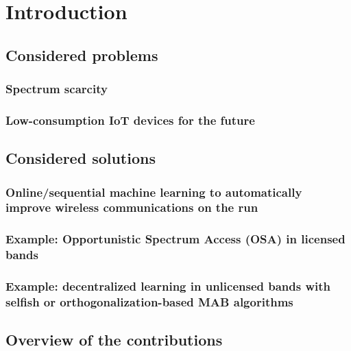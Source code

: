 
\chapter{Introduction}
\label{chapter:1}
\minitoc
\newpage
\graphicspath{{2-Chapters/1-Chapter/Images/}}

\section{Considered problems}
\label{sec:1:problems}

\subsection{Spectrum scarcity}


\subsection{Low-consumption IoT devices for the future}


\section{Considered solutions}
\label{sec:1:solutions}


\subsection{Online/sequential machine learning to automatically improve wireless communications on the run}

\subsection{Example: Opportunistic Spectrum Access (OSA) in licensed bands}

\subsection{Example: decentralized learning in unlicensed bands with selfish or orthogonalization-based MAB algorithms}


\section{Overview of the contributions}
\label{sec:1:contributions}


